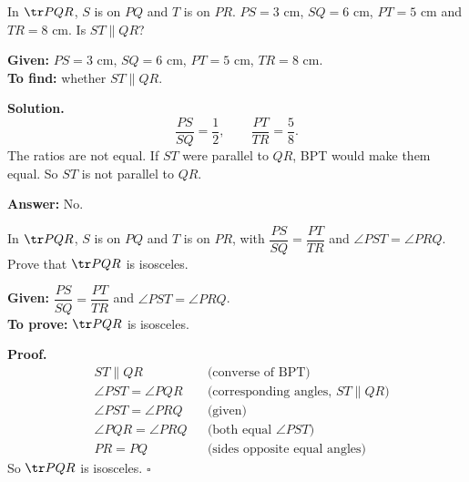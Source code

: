 \begin{example}
In $\tr PQR$, $S$ is on $PQ$ and $T$ is on $PR$. $PS=3$ cm, $SQ=6$ cm, $PT=5$ cm and $TR=8$ cm. Is $ST\parallel QR$?

\textbf{Given:} $PS=3$ cm, $SQ=6$ cm, $PT=5$ cm, $TR=8$ cm.\\
\textbf{To find:} whether $ST\parallel QR$.

\textbf{Solution.}
\[
\dfrac{PS}{SQ}=\dfrac12,\qquad \dfrac{PT}{TR}=\dfrac58.
\]
The ratios are not equal. If $ST$ were parallel to $QR$, BPT would make them equal. So $ST$ is not parallel to $QR$.

\textbf{Answer:} No.
\end{example}

\begin{example}
In $\tr PQR$, $S$ is on $PQ$ and $T$ is on $PR$, with $\dfrac{PS}{SQ}=\dfrac{PT}{TR}$ and $\angle PST=\angle PRQ$. Prove that $\tr PQR$ is isosceles.


\textbf{Given:} $\dfrac{PS}{SQ}=\dfrac{PT}{TR}$ and $\angle PST=\angle PRQ$.\\
\textbf{To prove:} $\tr PQR$ is isosceles.

\textbf{Proof.}
\[
\begin{aligned}
&ST\parallel QR &&\text{(converse of BPT)}\\
&\angle PST=\angle PQR &&\text{(corresponding angles, $ST\parallel QR$)}\\
&\angle PST=\angle PRQ &&\text{(given)}\\
&\angle PQR=\angle PRQ &&\text{(both equal $\angle PST$)}\\
&PR=PQ &&\text{(sides opposite equal angles)}
\end{aligned}
\]
So $\tr PQR$ is isosceles. \hfill$\square$
\end{example}

